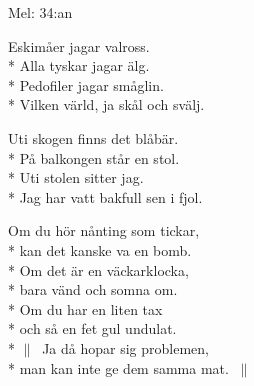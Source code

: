 \begin{SongText}[Bakfyllosofen]
    \begin{SongInfo}
        Mel: 34:an
    \end{SongInfo}
    \begin{SongVerse}
        Eskimåer jagar valross.\\*%
        Alla tyskar jagar älg.\\*%
        Pedofiler jagar småglin.\\*%
        Vilken värld, ja skål och svälj.
    \end{SongVerse}
    \begin{SongVerse}
        Uti skogen finns det blåbär.\\*%
        På balkongen står en stol.\\*%
        Uti stolen sitter jag.\\*%
        Jag har vatt bakfull sen i fjol.
    \end{SongVerse}
    \begin{SongVerse}
        Om du hör nånting som tickar,\\*%
        kan det kanske va en bomb.\\*%
        Om det är en väckarklocka,\\*%
        bara vänd och somna om.\\*%
        Om du har en liten tax\\*%
        och så en fet gul undulat.\\*%
        $\|\:$ Ja då hopar sig problemen,\\*%
        man kan inte ge dem samma mat. $\:\|$
    \end{SongVerse}
\end{SongText}
